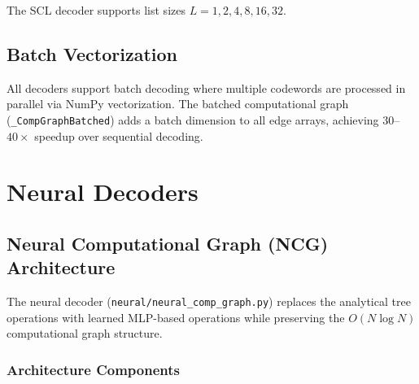 \documentclass[11pt,a4paper]{article}
\begin{document}
The SCL decoder supports list sizes $L = 1, 2, 4, 8, 16, 32$.

\subsection{Batch Vectorization}

All decoders support batch decoding where multiple codewords are processed
in parallel via NumPy vectorization. The batched computational graph
(\texttt{\_CompGraphBatched}) adds a batch dimension to all edge arrays,
achieving $30$--$40\times$ speedup over sequential decoding.


\section{Neural Decoders}
\label{sec:neural}

\subsection{Neural Computational Graph (NCG) Architecture}

The neural decoder (\texttt{neural/neural\_comp\_graph.py}) replaces the
analytical tree operations with learned MLP-based operations while
preserving the $O(N \log N)$ computational graph structure.

\subsubsection{Architecture Components}
\end{document}
